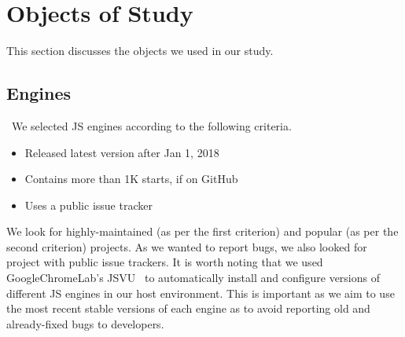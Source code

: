 \documentclass[10pt,conference,anonymous]{IEEEtran}
\begin{document}

\section{Objects of Study}
\label{sec:methodology}

This section discusses the objects we used in our study.

\subsection{Engines}
\label{sec:methodology:engines}~We selected 
JS engines according to the following criteria.

\begin{itemize}
\item Released latest version after Jan 1, 2018
\item Contains more than 1K starts, if on GitHub  
\item Uses a public issue tracker
\end{itemize}  

We look for highly-maintained (as per the first criterion) and popular
(as per the second criterion) projects. As we wanted to report bugs,
we also looked for project with public issue trackers.
It is worth noting that we used
GoogleChromeLab's JSVU~\cite{jsvu} to automatically install and configure versions of
different JS engines in our host environment. This is important as we
aim to use the most recent stable versions of each engine as to avoid
reporting old and already-fixed bugs to developers.

\end{document}
